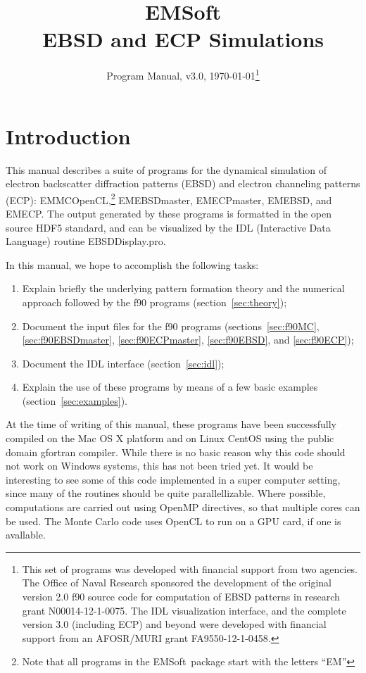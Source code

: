 \documentclass[DIV=calc, paper=letter, fontsize=11pt]{scrartcl}	 %
\title{EMSoft\\ EBSD and ECP Simulations} %
\author{\vspace*{-0.7in}} %
\date{Program Manual, v3.0, \today\protect\footnote{This set of programs was developed with financial support from two agencies. 
The Office of Naval Research sponsored the development of the original version 2.0 f90 source code for computation of EBSD patterns in research 
grant N00014-12-1-0075.  The IDL visualization interface, and the complete version 3.0 (including ECP) and beyond were developed with financial 
support from an AFOSR/MURI grant FA9550-12-1-0458.}}
\newcommand{\ctp}{\textsf{EMSoft}}
\begin{document}
\maketitle

\begin{figure}[h]
\leavevmode\centering
\epsfxsize=4.0in
\end{figure}

\renewcommand{\contentsname}{Table of Contents}
{\small\tableofcontents}

\newpage
\section{Introduction}
This manual describes a suite of programs for the dynamical simulation of electron backscatter diffraction patterns (EBSD) and electron channeling patterns (ECP):
\textsf{EMMCOpenCL},\footnote{Note that all programs in the \ctp\ package start with the letters ``EM''} \textsf{EMEBSDmaster}, \textsf{EMECPmaster}, \textsf{EMEBSD},
and \textsf{EMECP}.  The output generated by these programs is formatted in the open source HDF5 standard, and
can be visualized by the IDL (Interactive Data Language) routine \textsf{EBSDDisplay.pro}.  

In this manual, we hope to accomplish the following tasks:
\begin{enumerate}
	\item Explain briefly the underlying pattern formation theory and the numerical approach followed by the f90 programs (section~\ref{sec:theory});
	\item Document the input files for the f90 programs (sections~\ref{sec:f90MC}, \ref{sec:f90EBSDmaster}, \ref{sec:f90ECPmaster}, \ref{sec:f90EBSD}, and \ref{sec:f90ECP});
	\item Document the IDL interface (section~\ref{sec:idl});
	\item Explain the use of these programs by means of a few basic examples (section~\ref{sec:examples}).
\end{enumerate}

At the time of writing of this manual, these programs have been successfully compiled on the Mac OS X platform and on Linux CentOS using the public domain gfortran compiler.  
While there is no basic reason why this code should not work on Windows systems, this has not been tried yet.
It would be interesting to see some of this code implemented in a super computer setting, since many of the routines should be quite parallellizable.  Where possible, computations
are carried out using OpenMP directives, so that multiple cores can be used.  The Monte Carlo code uses OpenCL to run on a GPU card, if one is avallable.
\end{document}

